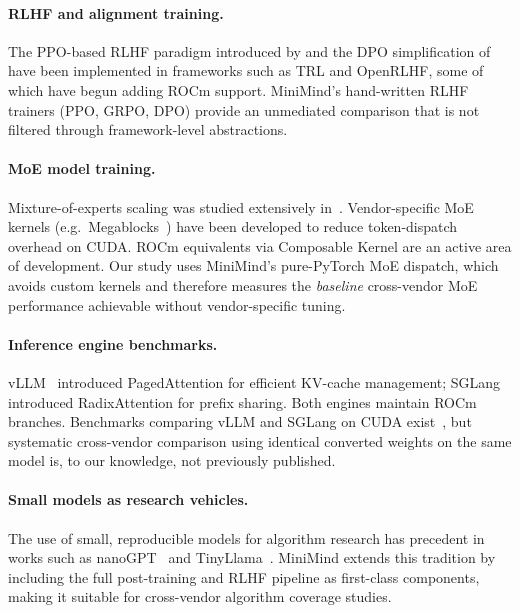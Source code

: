 \paragraph{RLHF and alignment training.}
The PPO-based RLHF paradigm introduced by \citet{ouyang2022training} and the DPO
simplification of \citet{rafailov2023direct} have been implemented in frameworks such as
TRL and OpenRLHF, some of which have begun adding ROCm support.  MiniMind's
hand-written RLHF trainers (PPO, GRPO, DPO) provide an unmediated comparison
that is not filtered through framework-level abstractions.

\paragraph{MoE model training.}
Mixture-of-experts scaling was studied extensively in~\citet{gshard,switch_transformer}.
Vendor-specific MoE kernels (e.g.\ Megablocks~\citep{megablocks}) have been
developed to reduce token-dispatch overhead on CUDA.  ROCm equivalents via
Composable Kernel are an active area of development.  Our study uses
MiniMind's pure-PyTorch MoE dispatch, which avoids custom kernels and
therefore measures the \emph{baseline} cross-vendor MoE performance
achievable without vendor-specific tuning.

\paragraph{Inference engine benchmarks.}
vLLM~\citep{kwon2023efficient} introduced PagedAttention for efficient KV-cache management;
SGLang~\citep{zheng2024sglang} introduced RadixAttention for prefix sharing.  Both
engines maintain ROCm branches.  Benchmarks comparing vLLM and SGLang on
CUDA exist~\citep{zheng2024sglang}, but systematic cross-vendor comparison using
identical converted weights on the same model is, to our knowledge, not
previously published.

\paragraph{Small models as research vehicles.}
The use of small, reproducible models for algorithm research has precedent in
works such as nanoGPT~\citep{nanogpt} and TinyLlama~\citep{tinyllama}.
MiniMind extends this tradition by including the full post-training and RLHF
pipeline as first-class components, making it suitable for cross-vendor
algorithm coverage studies.

